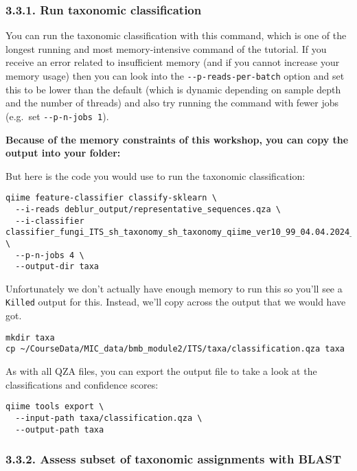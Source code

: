 \documentclass[
]{book}
\begin{document}
\subsubsection{3.3.1. Run taxonomic classification}\label{run-taxonomic-classification-2}

You can run the taxonomic classification with this command, which is one of the longest running and most memory-intensive command of the tutorial. If you receive an error related to insufficient memory (and if you cannot increase your memory usage) then you can look into the \texttt{-\/-p-reads-per-batch} option and set this to be lower than the default (which is dynamic depending on sample depth and the number of threads) and also try running the command with fewer jobs (e.g.~set \texttt{-\/-p-n-jobs\ 1}).

\textbf{Because of the memory constraints of this workshop, you can copy the output into your folder:}

But here is the code you would use to run the taxonomic classification:

\begin{verbatim}
qiime feature-classifier classify-sklearn \
  --i-reads deblur_output/representative_sequences.qza \
  --i-classifier classifier_fungi_ITS_sh_taxonomy_sh_taxonomy_qiime_ver10_99_04.04.2024_dev.qza \
  --p-n-jobs 4 \
  --output-dir taxa
\end{verbatim}

Unfortunately we don't actually have enough memory to run this so you'll see a \texttt{Killed} output for this.
Instead, we'll copy across the output that we would have got.

\begin{verbatim}
mkdir taxa      
cp ~/CourseData/MIC_data/bmb_module2/ITS/taxa/classification.qza taxa
\end{verbatim}

As with all QZA files, you can export the output file to take a look at the classifications and confidence scores:

\begin{verbatim}
qiime tools export \
  --input-path taxa/classification.qza \
  --output-path taxa
\end{verbatim}

\subsubsection{3.3.2. Assess subset of taxonomic assignments with BLAST}\label{assess-subset-of-taxonomic-assignments-with-blast-2}
\end{document}
